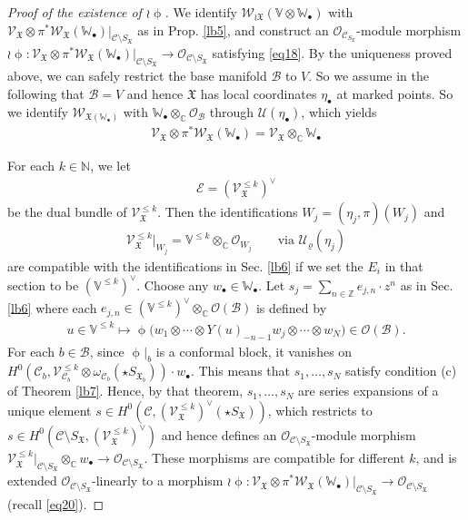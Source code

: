 \documentclass[12pt,a4paper,notitlepage]{article}
\theoremstyle{definition}
\theoremstyle{plain}
\newcommand{\fk}{\mathfrak}
\newcommand{\mc}{\mathcal}
\newcommand{\scr}{\mathscr}
\newcommand{\SX}{{S_{\fk X}}}
\newcommand{\blt}{\bullet}
\newcommand{\Vbb}{\mathbb V}
\newcommand{\Wbb}{\mathbb W}
\newcommand{\Cbb}{\mathbb C}
\newcommand{\Nbb}{\mathbb N}
\newcommand{\Zbb}{\mathbb Z}
\newcommand{\SXb}{{S_{\fk X_b}}}
\numberwithin{equation}{section}
\begin{document}
\begin{proof}[Proof  of the existence of $\wr\upphi$]
We identify $\scr W_{\wr\fk X}(\Vbb\otimes\Wbb_\blt)$ with $\scr V_{\fk X}\otimes\pi^*\scr W_{\fk X}(\Wbb_\blt)\big|_{\mc C\setminus\SX}$ as in Prop. \ref{lb5}, and construct  an $\scr O_{\mc C_\SX}$-module morphism $\wr\upphi:\scr V_{\fk X}\otimes\pi^*\scr W_{\fk X}(\Wbb_\blt)\big|_{\mc C\setminus\SX}\rightarrow\scr O_{\mc C\setminus\SX}$ satisfying \eqref{eq18}. By the uniqueness proved above, we can safely restrict the base manifold $\mc B$ to $V$. So we assume in the following that $\mc B=V$ and hence $\fk X$ has local coordinates $\eta_\blt$ at marked points. So we identify $\scr W_{\fk X(\Wbb_\blt)}$ with $\Wbb_\blt\otimes_\Cbb\scr O_{\mc B}$ through $\mc U(\eta_\blt)$, which yields
\begin{align}
\scr V_{\fk X}\otimes\pi^*\scr W_{\fk X}(\Wbb_\blt)=\scr V_{\fk X}\otimes_\Cbb\Wbb_\blt	\label{eq20}
\end{align}

For each $k\in\Nbb$, we let
\begin{align*}
	\scr E=(\scr V_{\fk X}^{\leq k})^\vee	
\end{align*}
be the dual bundle of $\scr V_{\fk X}^{\leq k}$. Then the identifications $W_j=(\eta_j,\pi)(W_j)$ and
\begin{align}
\scr V_{\fk X}^{\leq k}|_{W_j}=\Vbb^{\leq k}\otimes_\Cbb\scr O_{W_j} \qquad\text{via }\mc U_\varrho(\eta_j)	\label{eq24}
\end{align}
are compatible with the identifications in Sec. \ref{lb6} if we set the $E_i$ in that section to be $(\Vbb^{\leq k})^\vee$. Choose any $w_\blt\in\Wbb_\blt$. Let $s_j=\sum_{n\in\Zbb}e_{j,n}\cdot z^n$ as in Sec. \ref{lb6} where each $e_{j,n}\in (\Vbb^{\leq k})^\vee\otimes_\Cbb\scr O(\mc B)$ is defined by
\begin{align*}
u\in\Vbb^{\leq k}\mapsto\upphi\big(w_1\otimes\cdots\otimes Y(u)_{-n-1}w_j\otimes\cdots\otimes w_N\big)\in\scr O(\mc B).
\end{align*}
For each $b\in\mc B$, since $\upphi|_b$ is a conformal block, it vanishes on $H^0(\mc C_b,\scr V_{\mc C_b}^{\leq k}\otimes\omega_{\mc C_b}(\star\SXb))\cdot w_\blt$. This means that $s_1,\dots,s_N$ satisfy condition (c) of Theorem \ref{lb7}. Hence, by that theorem, $s_1,\dots,s_N$ are series expansions of a unique element $s\in H^0(\mc C,(\scr V_{\fk X}^{\leq k})^\vee(\star\SX))$, which restricts to $s\in H^0(\mc C\setminus\SX,(\scr V_{\fk X}^{\leq k})^\vee)$ and hence defines an $\scr O_{\mc C\setminus\SX}$-module morphism $\scr V_{\fk X}^{\leq k}|_{\mc C\setminus\SX}\otimes_\Cbb w_\blt\rightarrow\scr O_{\mc C\setminus\SX}$. These morphisms are compatible for different $k$, and is extended $\scr O_{\mc C\setminus\SX}$-linearly to a morphism $\wr\upphi:\scr V_{\fk X}\otimes\pi^*\scr W_{\fk X}(\Wbb_\blt)\big|_{\mc C\setminus\SX}\rightarrow \scr O_{\mc C\setminus\SX}$ (recall \eqref{eq20}). 


\end{proof}
\end{document}
